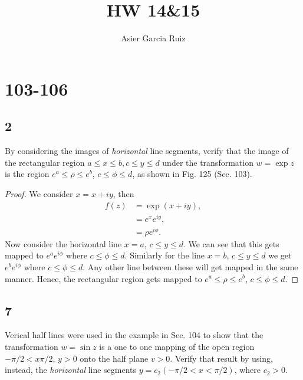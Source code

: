 \documentclass{article}
\title{HW 14\&15}
\author{Asier Garcia Ruiz }
\begin{document}
\maketitle

\section*{103-106}
\subsection*{2}
By considering the images of \textit{horizontal} line segments, verify that the
image of the rectangular region $a \leq x \leq b, c \leq y \leq d$ under the
transformation $w = \exp z$ is the region
$e^a \leq \rho \leq e^b$, $c\leq \phi \leq d$, as shown in Fig. 125 (Sec. 103).

\begin{proof}
    We consider $x = x + iy$, then
    \begin{align*}
        f(z) & = \exp(x + iy),   \\
             & = e^xe^{iy},      \\
             & = \rho e^{i\phi}.
    \end{align*}
    Now consider the horizontal line $x=a$, $c \leq y \leq d$. We can see that
    this gets mapped to $e^a e^{i\phi}$ where $c \leq \phi \leq d$. Similarly
    for the line $x=b$, $c \leq y \leq d$ we get
    $e^b e^{i\phi}$ where $c \leq \phi \leq d$. Any other line between these
    will get mapped in the same manner. Hence, the rectangular region
    gets mapped to $e^a \leq \rho \leq e^b$, $c \leq \phi \leq d$.
\end{proof}

\subsection*{7}
Verical half lines were used in the example in Sec. 104 to show that the
transformation $w = \sin z$ is a one to one mapping of the open region
$-\pi / 2 < x \pi / 2$, $y > 0$ onto the half plane $v > 0$.
Verify that result by using, instead, the \textit{horizontal} line segments
$y = c_2 (-\pi / 2 < x < \pi /2)$, where $c_2 > 0$.
\end{document}

